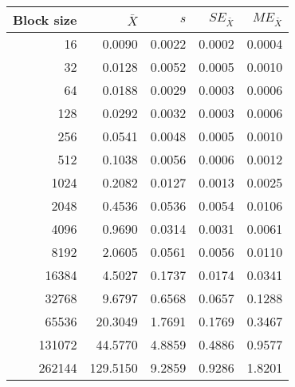\begin{tabular}{rrrrr}\toprule
{\small Block size} & $\bar{X}$ & $s$ & $SE_{\bar{X}}$ & $ME_{\bar{X}}$ \\\midrule
16 & 0.0090 & 0.0022 & 0.0002 & 0.0004\\
32 & 0.0128 & 0.0052 & 0.0005 & 0.0010\\
64 & 0.0188 & 0.0029 & 0.0003 & 0.0006\\
128 & 0.0292 & 0.0032 & 0.0003 & 0.0006\\
256 & 0.0541 & 0.0048 & 0.0005 & 0.0010\\
512 & 0.1038 & 0.0056 & 0.0006 & 0.0012\\
1024 & 0.2082 & 0.0127 & 0.0013 & 0.0025\\
2048 & 0.4536 & 0.0536 & 0.0054 & 0.0106\\
4096 & 0.9690 & 0.0314 & 0.0031 & 0.0061\\
8192 & 2.0605 & 0.0561 & 0.0056 & 0.0110\\
16384 & 4.5027 & 0.1737 & 0.0174 & 0.0341\\
32768 & 9.6797 & 0.6568 & 0.0657 & 0.1288\\
65536 & 20.3049 & 1.7691 & 0.1769 & 0.3467\\
131072 & 44.5770 & 4.8859 & 0.4886 & 0.9577\\
262144 & 129.5150 & 9.2859 & 0.9286 & 1.8201\\
\bottomrule
\end{tabular}
